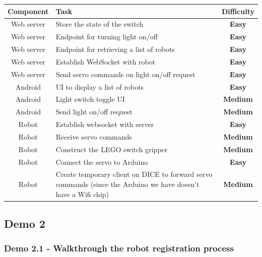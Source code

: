 \documentclass[onecolumn]{IEEEtran}
\newcommand{\easy}{{\color{green} \textbf{Easy}}}
\newcommand{\medium}{{\color{orange} \textbf{Medium}}}
\begin{document}
\begin{center}
    \begin{tabularx}{0.8\linewidth}{|c|L|c|}
        \hline
        \textbf{Component} & \textbf{Task} & \textbf{Difficulty} \\
        \hline
        Web server & Store the state of the switch & \easy \\
        \hline
        Web server & Endpoint for turning light on/off & \easy \\
        \hline
        Web server & Endpoint for retrieving a list of robots & \easy \\
        \hline
        Web server & Establish WebSocket with robot & \easy \\
        \hline
        Web server & Send servo commands on light on/off request & \easy \\
        \hline
        Android & UI to display a list of robots & \easy \\
        \hline
        Android & Light switch toggle UI & \medium \\
        \hline
        Android & Send light on/off request & \medium \\
        \hline
        Robot & Establish websocket with server & \easy \\
        \hline
        Robot & Receive servo commands & \medium \\
        \hline
        Robot & Construct the LEGO switch gripper & \medium \\
        \hline
        Robot & Connect the servo to Arduino & \easy \\
        \hline
        Robot & Create temporary client on DICE to forward servo commands (since the Arduino we have doesn’t have a Wifi chip) & \medium \\
        \hline
    \end{tabularx}
\end{center}

\subsection{Demo 2}

\subsubsection{Demo 2.1 - Walkthrough the robot registration process}
\end{document}
